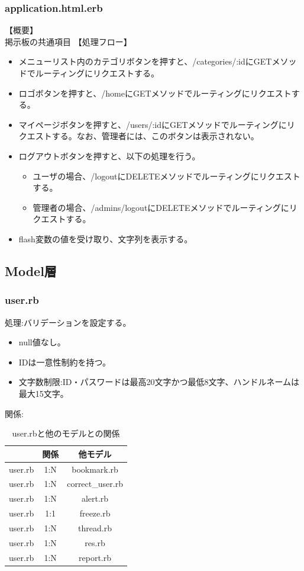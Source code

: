 \documentclass[a4j]{jarticle}
\begin{document}
\subsubsection{application.html.erb}
\noindent

【概要】\\
掲示板の共通項目
【処理フロー】
\begin{itemize}
 \item メニューリスト内のカテゴリボタンを押すと、/categories/:idにGETメソッドでルーティングにリクエストする。
 \item ロゴボタンを押すと、/homeにGETメソッドでルーティングにリクエストする。
 \item マイページボタンを押すと、/users/:idにGETメソッドでルーティングにリクエストする。なお、管理者には、このボタンは表示されない。
 \item ログアウトボタンを押すと、以下の処理を行う。
 \begin{itemize}
   \item ユーザの場合、/logoutにDELETEメソッドでルーティングにリクエストする。
   \item 管理者の場合、/admins/logoutにDELETEメソッドでルーティングにリクエストする。
 \end{itemize}
 \item flash変数の値を受け取り、文字列を表示する。
\end{itemize}

\subsection{Model層}

\subsubsection{user.rb}
  \noindent
  処理:バリデーションを設定する。
  \begin{itemize}
    \item null値なし。
    \item IDは一意性制約を持つ。
    \item 文字数制限:ID・パスワードは最高20文字かつ最低8文字、ハンドルネームは最大15文字。
  \end{itemize}
  関係:
  \begin{table}[H]
    \centering
    \caption{user.rbと他のモデルとの関係}
    \begin{tabular}{|c|c|c|}\hline
      & 関係 & 他モデル\\ \hline \hline
      user.rb & 1:N & bookmark.rb \\ \hline
      user.rb & 1:N & correct\_user.rb \\ \hline
      user.rb & 1:N & alert.rb \\ \hline
      user.rb & 1:1 & freeze.rb \\ \hline
      user.rb & 1:N & thread.rb \\ \hline
      user.rb & 1:N & res.rb \\ \hline
      user.rb & 1:N & report.rb \\ \hline
    \end{tabular}
  \end{table}
\end{document}
